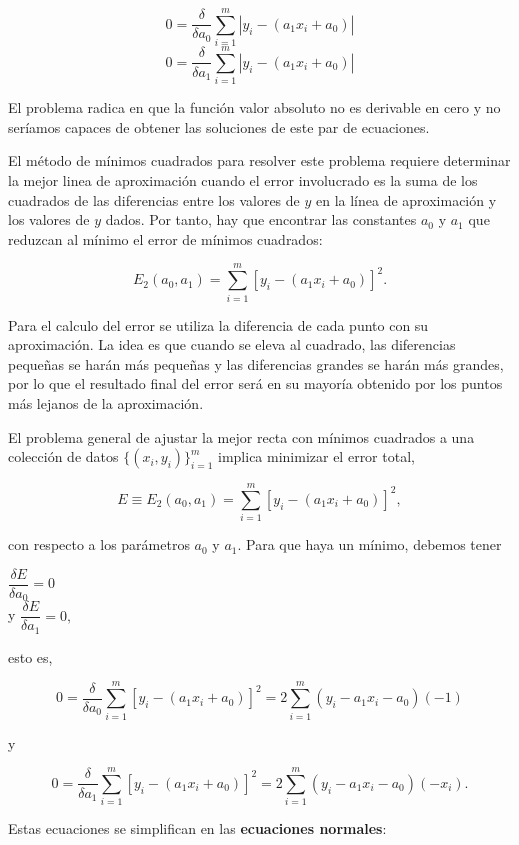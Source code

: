 	$$0 = \displaystyle{\dfrac{\delta}{\delta a_0} \sum_{i=1}^m |y_{i} - (a_1 x_i + a_0)|}$$
	$$0 = \displaystyle{\dfrac{\delta}{\delta a_1} \sum_{i=1}^m |y_{i} - (a_1 x_i + a_0)|}$$

El problema radica en que la función valor absoluto no es derivable en cero y no seríamos capaces de obtener las soluciones de este par
de ecuaciones.

El método de mínimos cuadrados para resolver este problema requiere determinar la mejor linea de aproximación cuando el error involucrado
es la suma de los cuadrados de las diferencias entre los valores de $y$ en la línea de aproximación y los valores de $y$ dados. Por tanto,
hay que encontrar las constantes $a_0$ y $a_1$ que reduzcan al mínimo el error de mínimos cuadrados:

$$E_2(a_0, a_1) = \sum_{i=1}^m \left[ y_i - (a_1x_i + a_0) \right]^2.$$

Para el calculo del error se utiliza la diferencia de cada punto con su aproximación. 
La idea es que cuando se eleva al cuadrado, las diferencias pequeñas se harán más pequeñas y las diferencias grandes se harán más grandes, 
por lo que el resultado final del error será en su mayoría obtenido por los puntos más lejanos de la aproximación.

El problema general de ajustar la mejor recta con mínimos cuadrados a una colección de datos $\{(x_i, y_i)\}_{i=1}^{m}$ implica minimizar
el error total,

$$E\equiv E_2(a_0, a_1) = \sum_{i=1}^{m} \left[ y_i - (a_1x_i + a_0) \right]^2,$$

con respecto a los parámetros $a_0$ y $a_1$. Para que haya un mínimo, debemos tener

\begin{center}
	$\displaystyle{\dfrac{\delta E}{\delta a_0}} = 0$\\ y $\displaystyle{\dfrac{\delta E}{\delta a_1}} = 0,$
\end{center}

esto es,

$$0 = \dfrac{\delta}{\delta a_0}\sum_{i=1}^{m} \left[ y_i - (a_1x_i + a_0) \right]^2 = 2\sum_{i=1}^{m} (y_i - a_1x_i - a_0)(-1)$$

y

$$0 = \dfrac{\delta}{\delta a_1}\sum_{i=1}^{m}\left[ y_i - (a_1x_i + a_0) \right]^2 = 2\sum_{i=1}^{m} (y_i - a_1x_i - a_0)(-x_i).$$

Estas ecuaciones se simplifican en las \textbf{ecuaciones normales}:

